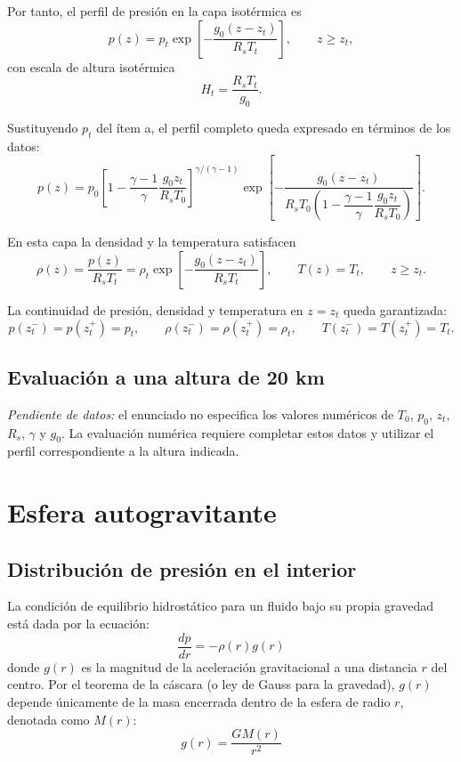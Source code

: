 \documentclass[11pt,a4paper]{article}
\begin{document}
Por tanto, el perfil de presión en la capa isotérmica es
\[
\boxed{\,p(z)=p_{t}\exp\left[-\frac{g_{0}(z-z_{t})}{R_{s}T_{t}}\right],
\qquad z\ge z_{t},\,}
\]
con escala de altura isotérmica
\[
H_{t}=\frac{R_{s}T_{t}}{g_{0}}.
\]

Sustituyendo $p_{t}$ del ítem a, el perfil completo queda expresado en términos de los datos:
\[
p(z)=p_{0}\left[1-\frac{\gamma-1}{\gamma}\frac{g_{0}z_{t}}{R_{s}T_{0}}\right]^{\gamma/(\gamma-1)}
\exp\left[-\frac{g_{0}(z-z_{t})}{R_{s}T_{0}\left(1-\dfrac{\gamma-1}{\gamma}\dfrac{g_{0}z_{t}}{R_{s}T_{0}}\right)}\right].
\]

En esta capa la densidad y la temperatura satisfacen
\[
\rho(z)=\frac{p(z)}{R_{s}T_{t}}
=\rho_{t}\exp\left[-\frac{g_{0}(z-z_{t})}{R_{s}T_{t}}\right],
\qquad T(z)=T_{t},\qquad z\ge z_{t}.
\]

La continuidad de presión, densidad y temperatura en $z=z_{t}$ queda garantizada:
\[
p(z_{t}^{-})=p(z_{t}^{+})=p_{t},\qquad
\rho(z_{t}^{-})=\rho(z_{t}^{+})=\rho_{t},\qquad
T(z_{t}^{-})=T(z_{t}^{+})=T_{t}.
\]

\subsection{Evaluación a una altura de 20 km}

\textit{Pendiente de datos:} el enunciado no especifica los valores numéricos de
$T_0$, $p_0$, $z_t$, $R_s$, $\gamma$ y $g_0$. La evaluación numérica requiere
completar estos datos y utilizar el perfil correspondiente a la altura indicada.


\clearpage

\section{Esfera autogravitante}

\subsection{Distribución de presión en el interior}

La condición de equilibrio hidrostático para un fluido bajo su propia gravedad está dada por la ecuación:
\[
\frac{dp}{dr} = -\rho(r) g(r)
\]
donde $g(r)$ es la magnitud de la aceleración gravitacional a una distancia $r$ del centro. Por el teorema de la cáscara (o ley de Gauss para la gravedad), $g(r)$ depende únicamente de la masa encerrada dentro de la esfera de radio $r$, denotada como $M(r)$:
\[
g(r) = \frac{G M(r)}{r^2}
\]
\end{document}
